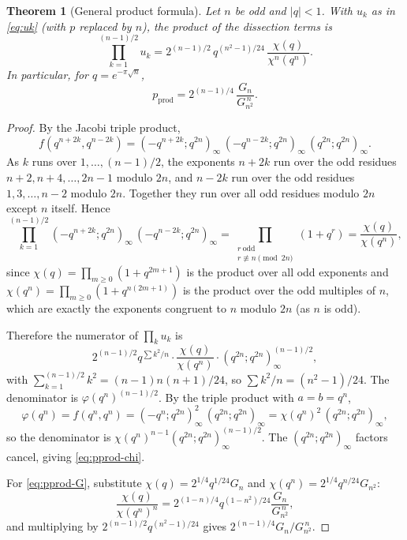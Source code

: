 \documentclass[11pt]{amsart}
\theoremstyle{plain}
\newtheorem{theorem}{Theorem}[section]
\theoremstyle{definition}
\theoremstyle{remark}
\newcommand{\pprod}{p_{\mathrm{prod}}}
\begin{document}
\begin{theorem}[General product formula]
\label{thm:pprod}
Let $n$ be odd and $|q|<1$. With $u_k$ as in \eqref{eq:uk} (with $p$ replaced by
$n$), the product of the dissection terms is
\begin{equation}
\prod_{k=1}^{(n-1)/2} u_k
= 2^{(n-1)/2}\, q^{(n^2-1)/24}\, \frac{\chi(q)}{\chi^n(q^n)}.
\label{eq:pprod-chi}
\end{equation}
In particular, for $q = e^{-\pi\sqrt{n}}$,
\begin{equation}
\pprod = 2^{(n-1)/4}\, \frac{G_n}{G_{n^2}^{\,n}}.
\label{eq:pprod-G}
\end{equation}
\end{theorem}

\begin{proof}
By the Jacobi triple product,
\begin{equation}
f(q^{n+2k}, q^{n-2k})
= (-q^{n+2k};q^{2n})_\infty\,(-q^{n-2k};q^{2n})_\infty\,(q^{2n};q^{2n})_\infty.
\end{equation}
As $k$ runs over $1, \dots, (n-1)/2$, the exponents $n+2k$ run over the odd residues
$n+2, n+4, \dots, 2n-1$ modulo $2n$, and $n-2k$ run over the odd residues
$1, 3, \dots, n-2$ modulo $2n$. Together they run over all odd residues modulo $2n$
except $n$ itself. Hence
\begin{equation}
\prod_{k=1}^{(n-1)/2} (-q^{n+2k};q^{2n})_\infty\,(-q^{n-2k};q^{2n})_\infty
= \prod_{\substack{r\ \mathrm{odd}\\ r \not\equiv n \pmod{2n}}} (1+q^r)
= \frac{\chi(q)}{\chi(q^n)},
\end{equation}
since $\chi(q) = \prod_{m\geq 0}(1+q^{2m+1})$ is the product over all odd exponents
and $\chi(q^n) = \prod_{m\geq 0}(1+q^{n(2m+1)})$ is the product over the odd multiples
of $n$, which are exactly the exponents congruent to $n$ modulo $2n$ (as $n$ is odd).

Therefore the numerator of $\prod_k u_k$ is
\begin{equation}
2^{(n-1)/2} q^{\sum k^2/n} \cdot \frac{\chi(q)}{\chi(q^n)}
\cdot (q^{2n};q^{2n})_\infty^{(n-1)/2},
\end{equation}
with $\sum_{k=1}^{(n-1)/2} k^2 = (n-1)n(n+1)/24$, so $\sum k^2/n = (n^2-1)/24$.
The denominator is $\varphi(q^n)^{(n-1)/2}$. By the triple product with $a=b=q^n$,
\begin{equation}
\varphi(q^n) = f(q^n,q^n) = (-q^n;q^{2n})_\infty^2\,(q^{2n};q^{2n})_\infty
= \chi(q^n)^2\,(q^{2n};q^{2n})_\infty,
\end{equation}
so the denominator is $\chi(q^n)^{n-1}(q^{2n};q^{2n})_\infty^{(n-1)/2}$. The
$(q^{2n};q^{2n})_\infty$ factors cancel, giving \eqref{eq:pprod-chi}.

For \eqref{eq:pprod-G}, substitute $\chi(q) = 2^{1/4}q^{1/24}G_n$ and
$\chi(q^n) = 2^{1/4}q^{n/24}G_{n^2}$:
\begin{equation}
\frac{\chi(q)}{\chi(q^n)^n}
= 2^{(1-n)/4} q^{(1-n^2)/24} \frac{G_n}{G_{n^2}^{\,n}},
\end{equation}
and multiplying by $2^{(n-1)/2}q^{(n^2-1)/24}$ gives
$2^{(n-1)/4}G_n/G_{n^2}^{\,n}$.
\end{proof}
\end{document}
